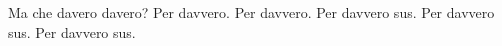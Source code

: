 \documentclass{article}
\begin{document}
Ma che davero davero?
Per davvero.
Per davvero.
Per davvero sus.
Per davvero sus.
Per davvero sus.
\end{document}
